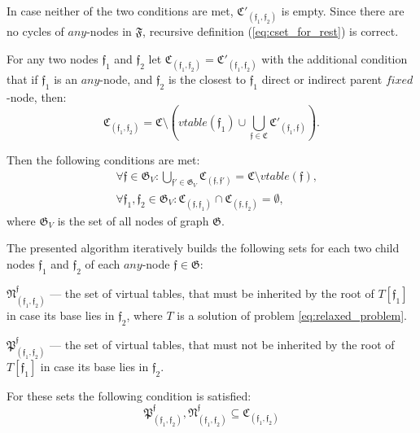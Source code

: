 \documentclass[times, 10pt,twocolumn]{article}
\newcommand{\gC}{\mathfrak{C}}
\newcommand{\gF}{\mathfrak{F}}
\newcommand{\gG}{\mathfrak{G}}
\newcommand{\gN}{\mathfrak{N}}
\newcommand{\gP}{\mathfrak{P}}
\newcommand{\gf}{\mathfrak{f}}
\newcommand{\nT}{\mathbb{T}}
\newcommand{\any}{\textit{any}}
\newcommand{\fixed}{\textit{fixed}}
\newcommand{\vtable}{\textit{vtable}}
\begin{document}
In case neither of the two conditions are met,
$\gC'_{(\gf_1, \gf_2)}$ is empty.
Since there are no cycles of $\any$-nodes in $\gF$,
recursive definition (\ref{eq:cset_for_rest}) is correct.

For any two nodes $\gf_1$ and $\gf_2$
let $\gC_{(\gf_1, \gf_2)} = \gC'_{(\gf_1, \gf_2)}$
with the additional condition that if $\gf_1$ is an $\any$-node,
and $\gf_2$ is the closest to $\gf_1$ direct or indirect parent $\fixed$-node,
then:
\begin{equation}
\gC_{(\gf_1, \gf_2)} = \gC \setminus \left( \vtable(\gf_1) \cup \bigcup_{\gf \in \gC} \gC'_{(\gf_1, \gf)} \right) \text{.}
\end{equation}

Then the following conditions are met:
\begin{equation}\label{eq:gc_props}
\begin{aligned}
&\forall \gf \in \gG_V: \bigcup_{\gf' \in \gG_V} \gC_{(\gf, \gf')} = \gC \setminus \vtable(\gf) \text{,} \\
&\forall \gf_1, \gf_2 \in \gG_V: \gC_{(\gf, \gf_1)} \cap \gC_{(\gf, \gf_2)} = \emptyset \text{,}
\end{aligned}
\end{equation}
where $\gG_V$ is the set of all nodes of graph $\gG$.


The presented algorithm iteratively builds the following sets
for each two child nodes $\gf_1$ and $\gf_2$ of each $\any$-node $\gf \in \gG$:

$\gN^{\gf}_{(\gf_1, \gf_2)}$ --- the set of virtual tables,
that must be inherited by the root of $T[\gf_1]$
in case its base lies in $\gf_2$,
where $T$ is a solution of problem \ref{eq:relaxed_problem}.

$\gP^{\gf}_{(\gf_1, \gf_2)}$ --- the set of virtual tables,
that must not be inherited by the root of $T[\gf_1]$
in case its base lies in $\gf_2$.

For these sets the following condition is satisfied:
\begin{equation}\label{eq:gn_gp_in_gc}
\gP^{\gf}_{(\gf_1, \gf_2)}, \gN^{\gf}_{(\gf_1, \gf_2)} \subseteq \gC_{(\gf_1, \gf_2)}
\end{equation}
\end{document}
